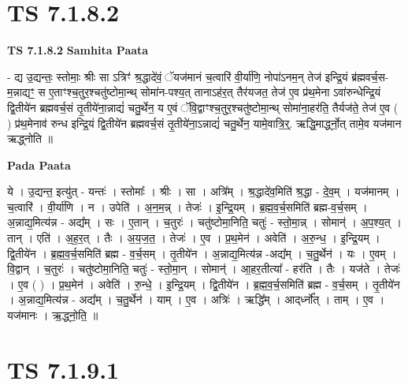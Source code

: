 \documentclass[17pt]{extarticle}
\begin{document}

\section{ TS 7.1.8.2 }

\textbf{TS 7.1.8.2 } \newline
\textbf{Samhita Paata} \newline

- द्य उ॒द्यन्तः॒ स्तोमाः॒ श्रीः सा ऽत्रिꣳ॑ श्र॒द्धादे॑वं॒ ॅयज॑मानं च॒त्वारि॑ वी॒र्या॑णि॒ नोपा॑ऽनम॒न् तेज॑ इन्द्रि॒यं ब्र॑ह्मवर्च॒स-म॒न्नाद्यꣳ॒॒ स ए॒ताꣳश्च॒तुर॒श्चतु॑ष्टोमा॒न्थ् सोमा॑न-पश्य॒त् तानाऽह॑र॒त् तैर॑यजत॒ तेज॑ ए॒व प्र॑थ॒मेना ऽवा॑रुन्धेन्द्रि॒यं द्वि॒तीये॑न ब्रह्मवर्च॒सं तृ॒तीये॑ना॒न्नाद्यं॑ चतु॒र्थेन॒ य ए॒वं ॅवि॒द्वाꣳश्च॒तुर॒श्चतु॑ष्टोमा॒न्थ् सोमा॑ना॒हर॑ति॒ तैर्यज॑ते॒ तेज॑ ए॒व ( ) प्र॑थ॒मेनाव॑ रुन्ध इन्द्रि॒यं द्वि॒तीये॑न ब्रह्मवर्च॒सं तृ॒तीये॑ना॒ऽन्नाद्यं॑ चतु॒र्थेन॒ यामे॒वात्रि॒र्॒. ऋद्धि॒मार्द्ध्नो॒त् तामे॒व यज॑मान ऋद्ध्नोति ॥ \newline

\textbf{Pada Paata} \newline

ये । उ॒द्यन्त॒ इत्यु॑त् - यन्तः॑ । स्तोमाः᳚ । श्रीः । सा । अत्रि᳚म् । श्र॒द्धादे॑व॒मिति॑ श्र॒द्धा - दे॒व॒म् । यज॑मानम् । च॒त्वारि॑ । वी॒र्या॑णि । न । उपेति॑ । अ॒न॒म॒न्न् । तेजः॑ । इ॒न्द्रि॒यम् । ब्र॒ह्म॒व॒र्च॒समिति॑ ब्रह्म-व॒र्च॒सम् । अ॒न्नाद्य॒मित्य॑न्न - अद्य᳚म् । सः । ए॒तान् । च॒तुरः॑ । चतु॑ष्टोमा॒निति॒ चतुः॑ - स्तो॒मा॒न्न् । सोमान्॑ । अ॒प॒श्य॒त् । तान् । एति॑ । अ॒ह॒र॒त् । तैः । अ॒य॒ज॒त॒ । तेजः॑ । ए॒व । प्र॒थ॒मेन॑ । अवेति॑ । अ॒रु॒न्ध॒ । इ॒न्द्रि॒यम् । द्वि॒तीये॑न । ब्र॒ह्म॒व॒र्च॒समिति॑ ब्रह्म - व॒र्च॒सम् । तृ॒तीये॑न । अ॒न्नाद्य॒मित्य॑न्न -अद्य᳚म् । च॒तु॒र्थेन॑ । यः । ए॒वम् । वि॒द्वान् । च॒तुरः॑ । चतु॑ष्टोमा॒निति॒ चतुः॑ - स्तो॒मा॒न् । सोमान्॑ । आ॒हर॒तीत्या᳚ - हर॑ति । तैः । यज॑ते । तेजः॑ । ए॒व ( ) । प्र॒थ॒मेन॑ । अवेति॑ । रु॒न्धे॒ । इ॒न्द्रि॒यम् । द्वि॒तीये॑न । ब्र॒ह्म॒व॒र्च॒समिति॑ ब्रह्म - व॒र्च॒सम् । तृ॒तीये॑न । अ॒न्नाद्य॒मित्य॑न्न - अद्य᳚म् । च॒तु॒र्थेन॑ । याम् । ए॒व । अत्रिः॑ । ऋद्धि᳚म् । आद्‌र्ध्नो᳚त् । ताम् । ए॒व । यज॑मानः । ऋ॒द्ध्नो॒ति॒ ॥  \newline





\section{ TS 7.1.9.1 }
\end{document}

